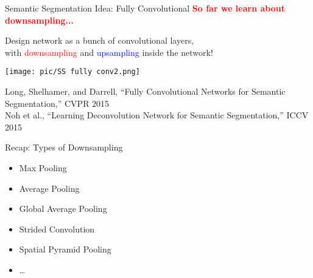 \documentclass[serif, aspectratio=169]{beamer}
\begin{document}
\begin{frame}{Semantic Segmentation Idea: Fully Convolutional}
    \textcolor{red}{\textbf{So far we learn about downsampling...}}

    \begin{center}
        \vspace{0.3cm}
        Design network as a bunch of convolutional layers, \\
        with \textcolor{red}{downsampling} and \textcolor{blue}{upsampling} inside the network!
    \end{center}
    
    \begin{center}
        \texttt{[image: pic/SS fully conv2.png]}
    \end{center}
    
    \vspace{0.5cm}
    
    \scriptsize{
    Long, Shelhamer, and Darrell, “Fully Convolutional Networks for Semantic Segmentation,” CVPR 2015 \\
    Noh et al., “Learning Deconvolution Network for Semantic Segmentation,” ICCV 2015
    }
\end{frame}

\begin{frame}{Recap: Types of Downsampling}
    \begin{itemize}
        \item Max Pooling
        \item Average Pooling
        \item Global Average Pooling
        \item Strided Convolution
        \item Spatial Pyramid Pooling
        \item \ldots
    \end{itemize}
\end{frame}
\end{document}
